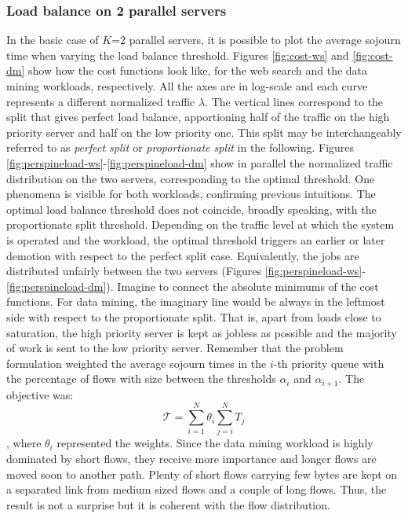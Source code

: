 \subsubsection{Load balance on 2 parallel servers}
\label{sec:load-balance-2-servers}
In the basic case of $K$=2 parallel servers, it is possible to plot the average sojourn time when varying the load balance threshold. Figures \ref{fig:cost-ws} and \ref{fig:cost-dm} show how the cost functions look like, for the web search and the data mining workloads, respectively. All the axes are in log-scale and each curve represents a different normalized traffic $\lambda$. The vertical lines correspond to the split that gives perfect load balance, apportioning half of the traffic on the high priority server and half on the low priority one. This split may be interchangeably referred to as \emph{perfect split} or \emph{proportionate split} in the following. Figures \ref{fig:perspineload-ws}-\ref{fig:perspineload-dm} show in parallel the normalized traffic distribution on the two servers, corresponding to the optimal threshold. One phenomena is visible for both workloads, confirming previous intuitions. The optimal load balance threshold does not coincide, broadly speaking, with the proportionate split threshold. Depending on the traffic level at which the system is operated and the workload, the optimal threshold triggers an earlier or later demotion with respect to the perfect split case. Equivalently, the jobs are distributed unfairly between the two servers (Figures \ref{fig:perspineload-ws}-\ref{fig:perspineload-dm}). Imagine to connect the absolute minimums of the cost functions. For data mining, the imaginary line would be always in the leftmost side with respect to the proportionate split. That is, apart from loads close to saturation, the high priority server is kept as jobless as possible and the majority of work is sent to the low priority server. Remember that the problem formulation weighted the average sojourn times in the $i$-th priority queue with the percentage of flows with size between the thresholds $\alpha_{i}$ and $\alpha_{i+1}$. The objective was:
\[
\mathcal{T} = \sum_{i=1}^{N}\theta_i \sum_{j=i}^{N}T_j
\]
, where $\theta_i$ represented the weights. Since the data mining workload is highly dominated by short flows, they receive more importance and longer flows are moved soon to another path. Plenty of short flows carrying few bytes are kept on a separated link from medium sized flows and a couple of long flows. Thus, the result is not a surprise but it is coherent with the flow distribution. \\
